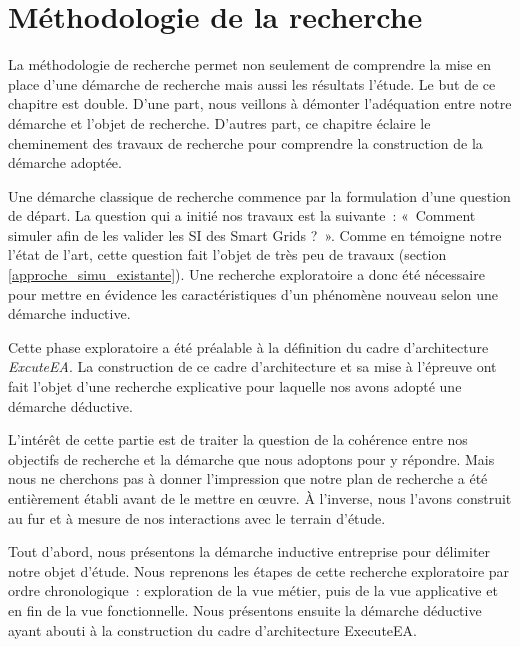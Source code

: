 \chapter{Méthodologie de la recherche}
\label{ch:methodo}

\PartialToc

La méthodologie de recherche permet non seulement de comprendre la mise en place 
d'une démarche de recherche mais aussi les résultats l'étude. Le but de ce 
chapitre est double. D'une part, nous veillons à démonter l'adéquation entre 
notre démarche et l'objet de recherche. D'autres part, ce chapitre éclaire le 
cheminement des travaux de recherche pour comprendre la construction de la 
démarche adoptée. 

Une démarche classique de recherche commence par la formulation d'une question 
de départ. La question qui a initié nos travaux est la suivante~: «~Comment 
simuler afin de les valider les SI des Smart Grids ?~».  Comme en témoigne notre 
l'état de l'art, cette question fait l'objet de très peu de travaux (section 
\ref{approche_simu_existante}). Une recherche exploratoire a donc été nécessaire 
pour mettre en évidence les caractéristiques d'un phénomène nouveau selon une 
démarche inductive. 

Cette phase exploratoire a été préalable à la définition du cadre d'architecture 
\textit{ExcuteEA}. La construction de ce cadre d'architecture et sa mise à 
l'épreuve ont fait l'objet d'une recherche explicative pour laquelle nos avons 
adopté une démarche déductive.

L'intérêt de cette partie est de traiter la question de la cohérence entre nos 
objectifs de recherche et la démarche que nous adoptons pour y répondre. Mais 
nous ne cherchons pas à donner l'impression que notre plan de recherche a été 
entièrement établi avant de le mettre en œuvre. À l'inverse, nous l'avons 
construit au fur et à mesure de nos interactions avec le terrain d'étude. 

Tout d'abord, nous présentons la démarche inductive entreprise pour délimiter 
notre objet d'étude. Nous reprenons les étapes de cette recherche exploratoire 
par ordre chronologique~: exploration de la vue métier, puis de la vue 
applicative et en fin de la vue fonctionnelle. Nous présentons ensuite la 
démarche déductive ayant abouti à la construction du cadre d'architecture 
ExecuteEA.


